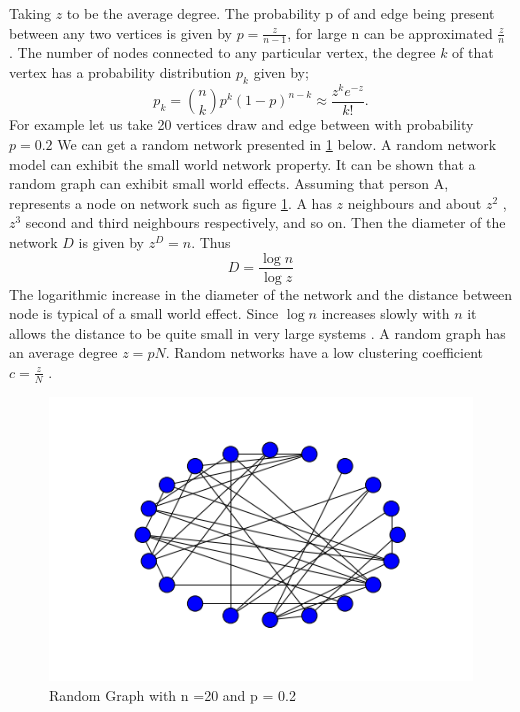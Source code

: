 Taking $z$ to be the average degree. The probability p of and edge being present between any two vertices is given by $p = \frac{z}{n-1}$, for large n can be approximated  $\frac{z}{n}$  \citep{newman2002random}. The number of nodes connected to any particular vertex, the degree $k$ of that vertex has a probability distribution $p_k$ given by;
 \begin{equation}
 p_k = \binom{n}{k} p^k (1-p)^{n-k} \approx \frac{z^k e^{-z}}{k!}.
 \end{equation}
   For example let us take 20 vertices draw and edge between with probability $p = 0.2$ We can get a random network presented in \ref{fig:3.1} below. A random network model can exhibit the small world network property. 
   It can be shown that a random graph can exhibit small world effects. Assuming that person A, represents a node on network such as  figure \ref{fig:3.1}. A has $z$ neighbours and  about $z^2$ , $z^3$  second and third neighbours respectively, and so on. Then the diameter of the network $D$ is given by $z^D = n$. Thus
   \begin{equation*}
   D = \frac{\log n}{\log z}
   \end{equation*}
    The logarithmic increase in the diameter of the network and the distance between node is typical of a small world effect. Since $\log n$ increases slowly with $n$ it allows the distance to be quite small in very large systems \citep{newman2000models}.
    A random graph  has an average degree $z= pN$. Random networks have a low clustering coefficient $ c = \frac{z}{N}$ \citep{newman2003structure}.
   \begin{figure}[h!]
   \caption{Random Graph with n =20 and p = 0.2}
   \label{fig:3.1}
   \centering
   \includegraphics[scale=0.5]{images/randomgraph.png} 
   \end{figure}
   
